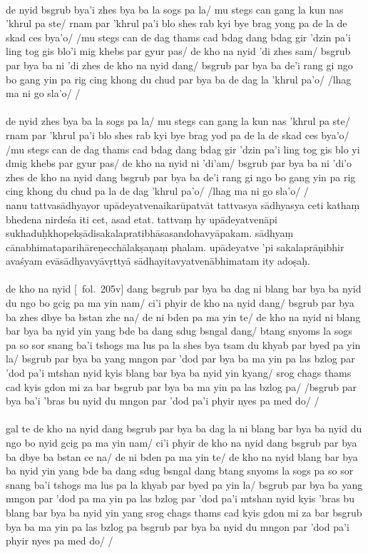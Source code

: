 \documentclass[12pt]{article}
\begin{document}
\textbf{\TVA}\\
de nyid bsgrub bya'i zhes bya ba la sogs pa la/ mu stegs can gang la kun nas 'khrul pa ste/ rnam par 'khrul pa'i blo shes rab kyi bye brag yong pa de la de skad ces bya'o/ /mu stegs can de dag thams cad bdag dang bdag gir 'dzin pa'i ling tog gis blo'i mig khebs par gyur pas/ de kho na nyid 'di zhes sam/ bsgrub par bya ba ni 'di zhes de kho na nyid dang/ bsgrub par bya ba de'i rang gi ngo bo gang yin pa rig cing khong du chud par bya ba de dag la 'khrul pa'o/ /lhag ma ni go sla'o/ /\\

\textbf{\TVB}\\
de nyid zhes bya ba la sogs pa la/ mu stegs can gang la kun nas 'khrul pa ste/ rnam par 'khrul pa'i blo shes rab kyi bye brag yod pa de la de skad ces bya'o/ /mu stegs can de dag thams cad bdag dang bdag gir 'dzin pa'i ling tog gis blo yi dmig khebs par gyur pas/ de kho na nyid ni 'di'am/ bsgrub par bya ba ni 'di'o zhes de kho na nyid dang bsgrub par bya ba de'i rang gi ngo bo gang yin pa rig cing khong du chud pa la de dag 'khrul pa'o/ /lhag ma ni go sla'o/ /\\

nanu tattvasādhyayor upādeyatvenaikarūpatvāt tattvasya sādhyasya ceti kathaṃ\footnoteB{
	tattvasya sādhyasya ceti kathaṃ] \EDD\ (\emd); tat kathaṃ tatvasya sādhyasya ceti \MS
} bhedena nirdeśa iti cet, asad etat.
tattvaṃ hy upādeyatvenāpi sukhaduḥkhopekṣādisakalapratibhāsasandohavyāpakam.
sādhyaṃ cānabhimataparihāreṇecchālakṣaṇaṃ phalam.
upādeyatve 'pi sakalaprāṇibhir avaśyam evāsādhyavyāvṛttyā sādhayitavyatvenābhimatam ity adoṣaḥ.\\

\textbf{\TVA}\\
de kho na nyid [\TVA\ fol.\ 205v] dang bsgrub par bya ba dag ni blang bar bya ba nyid du ngo bo gcig pa ma yin nam/ ci'i phyir de kho na nyid dang/ bsgrub par bya ba zhes dbye ba bstan zhe na/ de ni bden pa ma yin te/ de kho na nyid ni blang bar bya ba nyid yin yang bde ba dang sdug bsngal dang/ btang snyoms la sogs pa so sor snang ba'i tshogs ma lus pa la shes bya tsam du khyab par byed pa yin la/ bsgrub par bya ba yang mngon par 'dod par bya ba ma yin pa las bzlog par 'dod pa'i mtshan nyid kyis blang bar bya ba nyid yin kyang/ srog chags thams cad kyis gdon mi za bar bsgrub par bya ba ma yin pa las bzlog pa/ /bsgrub par bya ba'i 'bras bu nyid du mngon par 'dod pa'i phyir nyes pa med do/ /\\

\textbf{\TVB}\\
gal te de kho na nyid dang bsgrub par bya ba dag la ni blang bar bya ba nyid du ngo bo nyid gcig pa ma yin nam/ ci'i phyir de kho na nyid dang bsgrub par bya ba dbye ba bstan ce na/ de ni bden pa ma yin te/ de kho na nyid blang bar bya ba nyid yin yang bde ba dang sdug bsngal dang btang snyoms la sogs pa so sor snang ba'i tshogs ma lus pa la khyab par byed pa yin la/ bsgrub par bya ba yang mngon par 'dod pa ma yin pa las bzlog par 'dod pa'i mtshan nyid kyis 'bras bu blang bar bya ba nyid yin yang srog chags thams cad kyis gdon mi za bar bsgrub bya ba ma yin pa las bzlog pa bsgrub par bya ba nyid du mngon par 'dod pa'i phyir nyes pa med do/ /
\end{document}
